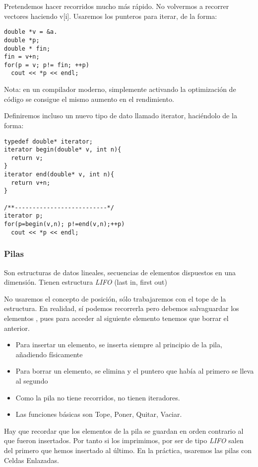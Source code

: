 \documentclass[11pt]{article}
\begin{document}
Pretendemos hacer recorridos mucho más rápido. No volvermos a recorrer vectores haciendo v[i]. Usaremos los punteros para iterar, de la forma:


\begin{verbatim}
double *v = &a.
double *p;
double * fin;
fin = v+n;
for(p = v; p!= fin; ++p)
  cout << *p << endl;
\end{verbatim}

Nota: en un compilador moderno, simplemente activando la optimización de código se consigue el mismo aumento en el rendimiento.

Definiremos incluso un nuevo tipo de dato llamado iterator, haciéndolo de la forma:

\begin{verbatim}
typedef double* iterator;
iterator begin(double* v, int n){
  return v;
}
iterator end(double* v, int n){
  return v+n;
}

/**--------------------------*/
iterator p;
for(p=begin(v,n); p!=end(v,n);++p)
  cout << *p << endl;
\end{verbatim}

\subsubsection{Pilas}
\label{sec-1-3-4}
Son estructuras de datos lineales, secuencias de elementos dispuestos en una dimensión. Tienen estructura \emph{LIFO} (last in, first out)

No usaremos el concepto de posición, sólo trabajaremos con el tope de la estructura. En realidad, sí podemos recorrerla pero debemos salvaguardar los elementos
, pues para acceder al siguiente elemento tenemos que borrar el anterior.

\begin{itemize}
\item Para insertar un elemento, se inserta siempre al principio de la pila, añadiendo físicamente
\item Para borrar un elemento, se elimina y el puntero que había al primero se lleva al segundo
\item Como la pila no tiene recorridos, no tienen iteradores.
\item Las funciones básicas son Tope, Poner, Quitar, Vaciar.
\end{itemize}

Hay que recordar que los elementos de la pila se guardan en orden contrario al que fueron insertados. Por tanto si los imprimimos, por ser de tipo \emph{LIFO} salen del 
primero que hemos insertado al último.
En la práctica, usaremos las pilas con Celdas Enlazadas.
\end{document}
